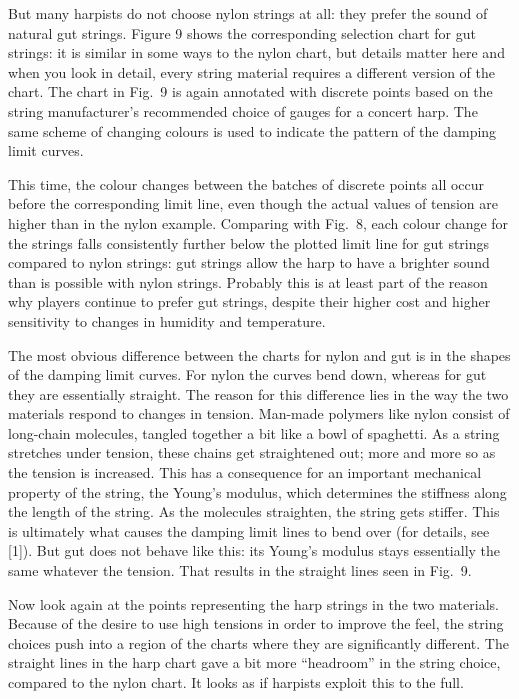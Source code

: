   But many harpists do not choose nylon strings at all: they prefer the sound 
  of natural gut strings. Figure 9 shows the corresponding selection chart for 
  gut strings: it is similar in some ways to the nylon chart, but details 
  matter here and when you look in detail, every string material requires a 
  different version of the chart. The chart in Fig.\ 9 is again annotated with 
  discrete points based on the string manufacturer's recommended choice of 
  gauges for a concert harp. The same scheme of changing colours is used to 
  indicate the pattern of the damping limit curves. 

  This time, the colour changes between the batches of discrete points all 
  occur before the corresponding limit line, even though the actual values of 
  tension are higher than in the nylon example. Comparing with Fig.\ 8, each 
  colour change for the strings falls consistently further below the plotted 
  limit line for gut strings compared to nylon strings: gut strings allow the 
  harp to have a brighter sound than is possible with nylon strings. Probably 
  this is at least part of the reason why players continue to prefer gut 
  strings, despite their higher cost and higher sensitivity to changes in 
  humidity and temperature. 

  The most obvious difference between the charts for nylon and gut is in the 
  shapes of the damping limit curves. For nylon the curves bend down, whereas 
  for gut they are essentially straight. The reason for this difference lies in 
  the way the two materials respond to changes in tension. Man-made polymers 
  like nylon consist of long-chain molecules, tangled together a bit like a 
  bowl of spaghetti. As a string stretches under tension, these chains get 
  straightened out; more and more so as the tension is increased. This has a 
  consequence for an important mechanical property of the string, the Young's 
  modulus, which determines the stiffness along the length of the string. As 
  the molecules straighten, the string gets stiffer. This is ultimately what 
  causes the damping limit lines to bend over (for details, see [1]). But gut 
  does not behave like this: its Young's modulus stays essentially the same 
  whatever the tension. That results in the straight lines seen in Fig.\ 9. 

  Now look again at the points representing the harp strings in the two 
  materials. Because of the desire to use high tensions in order to improve the 
  feel, the string choices push into a region of the charts where they are 
  significantly different. The straight lines in the harp chart gave a bit more 
  ``headroom'' in the string choice, compared to the nylon chart. It looks as 
  if harpists exploit this to the full. 

